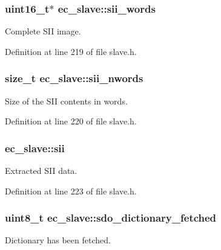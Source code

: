 \subsubsection[{sii\-\_\-words}]{\setlength{\rightskip}{0pt plus 5cm}uint16\-\_\-t$\ast$ ec\-\_\-slave\-::sii\-\_\-words}\label{structec__slave_a3886920f38a9b5a97c1d50f3c08e989a}


Complete S\-I\-I image. 



Definition at line 219 of file slave.\-h.

\subsubsection[{sii\-\_\-nwords}]{\setlength{\rightskip}{0pt plus 5cm}size\-\_\-t ec\-\_\-slave\-::sii\-\_\-nwords}\label{structec__slave_a9b6ee3261f586d6c30647b1494da0f57}


Size of the S\-I\-I contents in words. 



Definition at line 220 of file slave.\-h.

\subsubsection[{sii}]{ ec\-\_\-slave\-::sii}\label{structec__slave_a081433f5a30f9352fbc4363093ae1e16}


Extracted S\-I\-I data. 



Definition at line 223 of file slave.\-h.

\subsubsection[{sdo\-\_\-dictionary\-\_\-fetched}]{\setlength{\rightskip}{0pt plus 5cm}uint8\-\_\-t ec\-\_\-slave\-::sdo\-\_\-dictionary\-\_\-fetched}\label{structec__slave_a94732ef500405ce3afa15f6aeef4918d}


Dictionary has been fetched. 



